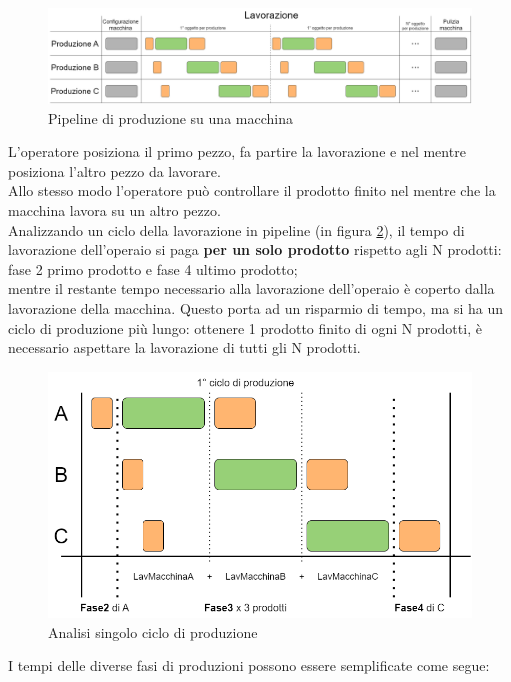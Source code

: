 \begin{figure}[H]
    \centering
    \includegraphics[width=\textwidth]{media/pipeline.drawio.png}
    \caption{Pipeline di produzione su una macchina}
    \label{fig:pipeline_di_produzione}
\end{figure}
L'operatore posiziona il primo pezzo, fa partire la lavorazione e nel mentre posiziona l'altro pezzo da lavorare. \\
Allo stesso modo l'operatore può controllare il prodotto finito nel mentre che la macchina lavora su un altro pezzo.\\
Analizzando un ciclo della lavorazione in pipeline (in figura \ref{fig:analisi_ciclo_di_produzione}), il tempo di lavorazione dell'operaio si paga \textbf{per un solo prodotto} rispetto agli N prodotti: fase 2 primo prodotto e fase 4 ultimo prodotto;\\
mentre il restante tempo necessario alla lavorazione dell'operaio è coperto dalla lavorazione della macchina.
Questo porta ad un risparmio di tempo, ma si ha un ciclo di produzione più lungo: ottenere 1 prodotto finito di ogni N prodotti, è necessario aspettare la lavorazione di tutti gli N prodotti.
\begin{figure}[H]
    \centering
    \includegraphics[width=\textwidth]{media/analisi_ciclo.drawio.png}
    \caption{Analisi singolo ciclo di produzione}
    \label{fig:analisi_ciclo_di_produzione}
\end{figure}
I tempi delle diverse fasi di produzioni possono essere semplificate come segue:
